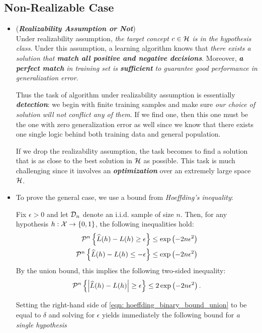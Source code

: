 \documentclass[11pt]{article}
\begin{document}
\subsection{Non-Realizable Case}
\begin{itemize}
\item \begin{remark}(\textbf{\emph{Realizability Assumption or Not}})\\
Under realizability assumption, \emph{the target concept $c \in {\mathcal H}$ is in the hypothesis class}. Under this assumption,  a learning algorithm knows that \emph{there exists a solution that \textbf{match all positive and negative decisions}}. Moreover, \emph{\textbf{a perfect match} in training set is \textbf{sufficient} to guarantee good performance in generalization error}.

Thus the task of algorithm under realizability assumption is essentially \emph{\textbf{detection}}: we begin with finite training samples and make sure \emph{our choice of solution will not conflict any of them}. If we find one, then this one must be the one with zero generalization error as well since we know that there exists one single logic behind both training data and general population.

If we drop the  realizability assumption, the task becomes to find a solution that is as close to the best solution in ${\mathcal H}$ as possible. This task is much challenging since it involves an \emph{\textbf{optimization}} over an extremely large space ${\mathcal H}$.
\end{remark}


\item To prove the general case, we use a bound from \emph{Hoeffding's inequality}:
\begin{proposition}
Fix $\epsilon > 0$ and let ${\mathcal D}_{n}$ denote an i.i.d. sample of size $n$. Then, for any hypothesis $h: {\mathcal X} \to \left\{0, 1\right\}$, the following inequalities hold:
\begin{align}
{\mathcal P}^n\left\{\widehat{L}(h)  - L(h) \ge \epsilon\right\} \le \exp\left(-2n\epsilon^2\right) \label{eqn: hoeffding_binary_bound_1}\\
{\mathcal P}^n\left\{\widehat{L}(h)  - L(h) \le -\epsilon\right\} \le \exp\left(-2n\epsilon^2\right) \label{eqn: hoeffding_binary_bound_2}
\end{align}
By the union bound, this implies the following two-sided inequality:
\begin{align}
{\mathcal P}^n\left\{\left\lvert \widehat{L}(h)  - L(h) \right\rvert \ge \epsilon\right\} \le 2\exp\left(-2n\epsilon^2\right). \label{eqn: hoeffding_binary_bound_union}
\end{align}
\end{proposition}
Setting the right-hand side of \eqref{eqn: hoeffding_binary_bound_union} to be equal to $\delta$ and solving for $\epsilon$ yields immediately the following bound for \emph{a single hypothesis}


\end{itemize}
\end{document}
